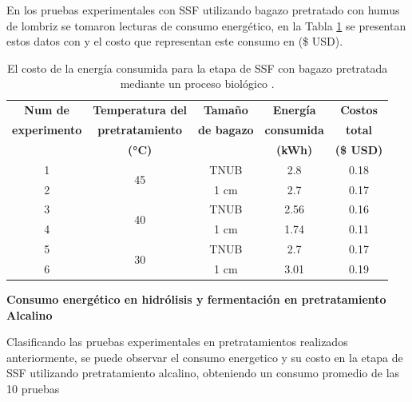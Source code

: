 \documentclass[12pt]{article}
\begin{document}
	En los pruebas experimentales con SSF utilizando bagazo pretratado con humus de lombriz se tomaron lecturas de consumo energético, en la Tabla \ref{pruebbio} se presentan estos datos con y el costo que representan este consumo en (\$ USD).
	

	\begin{table}[H]
	\centering
	\caption{El costo de la energía consumida para la etapa de SSF con bagazo pretratada mediante un proceso biológico . }
	\label{pruebbio}
	{\fontsize{9}{10.8}\selectfont %
		\begin{tabular}{|c|c|c|c|c|}
			\hline
			\textbf{Num de}&\textbf{Temperatura del} & \textbf{Tamaño } & \textbf{Energía } & \textbf{Costos } \\ 
		\textbf{experimento}&\textbf{pretratamiento} &	\textbf{ de bagazo}   & 	\textbf{consumida  }& 	\textbf{ total} \\ 
		&	\textbf{(°C)}  &    & \textbf{(kWh)} & \textbf{(\$ USD)} \\ \hline
	1	&	\multirow{2}{*}{45}& TNUB & 2.8 & 0.18 \\  \cline{3-5} \cline{1-1}
	2	&	& 1 cm & 2.7 & 0.17  \\ \hline 
	3	&	\multirow{2}{*}{40} & TNUB & 2.56 & 0.16  \\ \cline{3-5}\cline{1-1}
	4	&	& 1 cm & 1.74 & 0.11  \\ \hline
	5	&	\multirow{2}{*}{30}	& TNUB & 2.7 & 0.17  \\ \cline{3-5}\cline{1-1}
	6	&	& 1 cm & 3.01 & 0.19  \\ \hline
			
		\end{tabular}
	}
\end{table}




	
		\textbf{ Consumo energético en hidrólisis y fermentación en pretratamiento Alcalino }
	
	Clasificando las pruebas experimentales en pretratamientos realizados anteriormente, se puede observar el consumo energetico y su costo en la etapa de SSF utilizando pretratamiento alcalino, obteniendo un consumo promedio de las 10 pruebas
	
\end{document}
